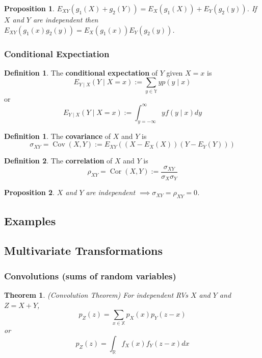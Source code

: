\documentclass[12pt]{article}
\newtheorem{thm}{Theorem}[section]
\newtheorem*{prop*}{Proposition}
\theoremstyle{definition}
\newtheorem{defn}{Definition}[subsection]
\newtheorem*{defn*}{Definition}
\newcommand{\R}{\mathbb{R}}
\newcommand{\X}{\mathbb{X}}
\newcommand{\Y}{\mathbb{Y}}
\DeclareMathOperator{\Cov}{Cov}
\DeclareMathOperator{\Cor}{Cor}
\begin{document}
\begin{prop*}
  $E_{XY}(g_1(X) + g_2(Y)) = E_X(g_1(X)) + E_Y(g_2(y))$.
  If $X$ and $Y$ are independent then $E_{XY}(g_1(x)g_2(y)) = E_X(g_1(x))E_Y(g_2(y))$.
\end{prop*}

\subsubsection{Conditional Expectiation}

\begin{defn}
  The \textbf{conditional expectation} of $Y$ given $X = x$ is
  $$E_{Y \mid X}(Y \mid X = x) := \sum_{y \in \Y}yp(y \mid x)$$
  or
  $$E_{Y \mid X}(Y \mid X = x) := \int_{y = -\infty}^{\infty}yf(y \mid x)dy$$
\end{defn}

\begin{defn*}
  The \textbf{covariance} of $X$ and $Y$ is
  $$\sigma_{XY} = \Cov(X, Y) := E_{XY}((X - E_X(X))(Y - E_Y(Y)))$$
\end{defn*}

\begin{defn}
  The \textbf{correlation} of $X$ and $Y$ is
  $$\rho_{XY} = \Cor(X, Y) := \frac{\sigma_{XY}}{\sigma_X\sigma_Y}$$
\end{defn}

\begin{prop*}
  $X$ and $Y$ are independent $\implies \sigma_{XY} = \rho_{XY} = 0$.
\end{prop*}

\subsection{Examples}

\subsection{Multivariate Transformations}

\subsubsection{Convolutions (sums of random variables)}


\begin{thm}
  (Convolution Theorem)
  For independent RVs $X$ and $Y$ and $Z = X + Y$,
  $$p_Z(z) = \sum_{x \in \X}p_X(x)p_Y(z - x)$$
  or
  $$p_Z(z) = \int_{\R}f_X(x)f_Y(z - x)dx$$
\end{thm}
\end{document}

